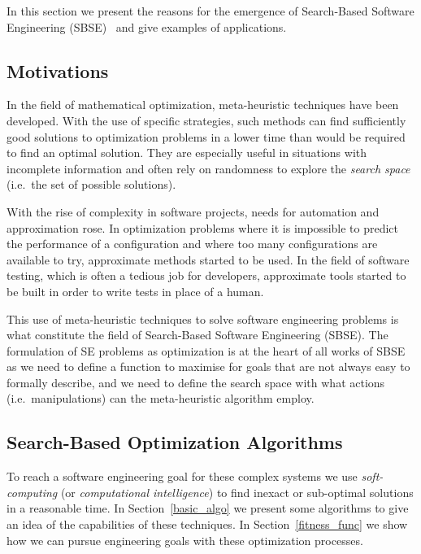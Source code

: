\documentclass[11pt]{sdm}
\begin{document}
In this section we present the reasons for the emergence of Search-Based Software Engineering (SBSE)~\cite{harman2001search,mcminn2011search} and give examples of applications.

\subsection{Motivations}
\label{motiv}
In the field of mathematical optimization, meta-heuristic techniques have been developed.
With the use of specific strategies, such methods can find sufficiently good solutions to optimization problems in a lower time than would be required to find an optimal solution.
They are especially useful in situations with incomplete information and often rely on randomness to explore the \textit{search space} (i.e.\ the set of possible solutions).

With the rise of complexity in software projects, needs for automation and approximation rose.
In optimization problems where it is impossible to predict the performance of a configuration and where too many configurations are available to try, approximate methods started to be used.
In the field of software testing, which is often a tedious job for developers, approximate tools started to be built in order to write tests in place of a human.

This use of meta-heuristic techniques to solve software engineering problems is what constitute the field of Search-Based Software Engineering (SBSE).
The formulation of SE problems as optimization is at the heart of all works of SBSE as we need to define a function to maximise for goals that are not always easy to formally describe, and we need to define the search space with what actions (i.e.\ manipulations) can the meta-heuristic algorithm employ.

\subsection{Search-Based Optimization Algorithms}
\label{example_algo}
To reach a software engineering goal for these complex systems we use \textit{soft-computing} (or \textit{computational intelligence}) to find inexact or sub-optimal solutions in a reasonable time.
In Section~\ref{basic_algo} we present some algorithms to give an idea of the capabilities of these techniques.
In Section~\ref{fitness_func} we show how we can pursue engineering goals with these optimization processes.
\end{document}
